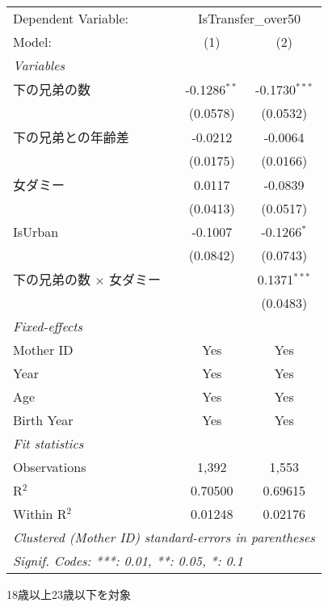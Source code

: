 \documentclass{article}
\begin{document}
\begingroup
\centering
\begin{threeparttable}[b]
   \begin{tabular}{lcc}
      \tabularnewline \midrule \midrule
      Dependent Variable: & \multicolumn{2}{c}{IsTransfer\_over50}\\
      Model:                          & (1)            & (2)\\  
      \midrule
      \emph{Variables}\\
      下の兄弟の数                    & -0.1286$^{**}$ & -0.1730$^{***}$\\   
                                      & (0.0578)       & (0.0532)\\   
      下の兄弟との年齢差              & -0.0212        & -0.0064\\   
                                      & (0.0175)       & (0.0166)\\   
      女ダミー                        & 0.0117         & -0.0839\\   
                                      & (0.0413)       & (0.0517)\\   
      IsUrban                         & -0.1007        & -0.1266$^{*}$\\   
                                      & (0.0842)       & (0.0743)\\   
      下の兄弟の数 $\times$ 女ダミー  &                & 0.1371$^{***}$\\   
                                      &                & (0.0483)\\   
      \midrule
      \emph{Fixed-effects}\\
      Mother ID                       & Yes            & Yes\\  
      Year                            & Yes            & Yes\\  
      Age                             & Yes            & Yes\\  
      Birth Year                      & Yes            & Yes\\  
      \midrule
      \emph{Fit statistics}\\
      Observations                    & 1,392          & 1,553\\  
      R$^2$                           & 0.70500        & 0.69615\\  
      Within R$^2$                    & 0.01248        & 0.02176\\  
      \midrule \midrule
      \multicolumn{3}{l}{\emph{Clustered (Mother ID) standard-errors in parentheses}}\\
      \multicolumn{3}{l}{\emph{Signif. Codes: ***: 0.01, **: 0.05, *: 0.1}}\\
   \end{tabular}
   
   \begin{tablenotes}\item 18歳以上23歳以下を対象
   \end{tablenotes}
\end{threeparttable}
\par\endgroup
\end{document}
